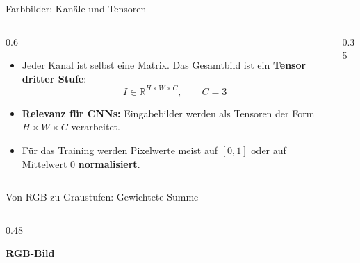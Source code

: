 {\begin{frame}{Farbbilder: Kanäle und Tensoren}
\begin{columns}
\begin{column}{0.6\textwidth}
\begin{itemize}
    \item Jeder Kanal ist selbst eine Matrix. Das Gesamtbild ist ein
    \textbf{Tensor dritter Stufe}:
    \[
        I \in \mathbb{R}^{H \times W \times C},
        \qquad C = 3
    \]

    \item \textbf{Relevanz für CNNs:} Eingabebilder werden als Tensoren
    der Form $H \times W \times C$ verarbeitet.

    \item Für das Training werden Pixelwerte meist auf $[0,1]$
    oder auf Mittelwert $0$ \textbf{normalisiert}.
\end{itemize}
\end{column}

\begin{column}{0.35\textwidth}

\end{column}
\end{columns}
\end{frame}


\begin{frame}{Von RGB zu Graustufen: Gewichtete Summe}
    \medskip
\footnotesize
\begin{columns}[T]

\begin{column}{0.48\textwidth}

\textbf{RGB-Bild}
\begin{center}
\begin{tikzpicture}[scale=0.55]


\end{tikzpicture}
\end{center}
\end{column}
\end{columns}
\end{frame}}
